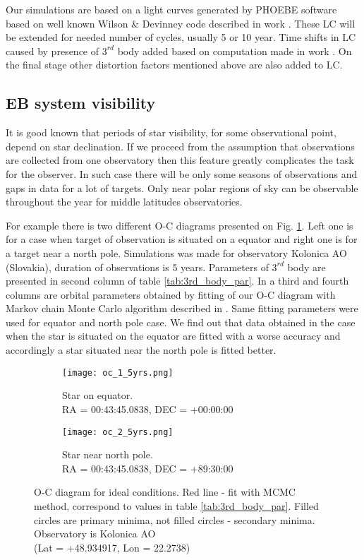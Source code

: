 Our simulations are based on a light curves generated by PHOEBE software \citep{Prsa2005} based on well known Wilson \& Devinney code described in work \cite{Wilson1971}. These LC will be extended for needed number of cycles, usually 5 or 10 year. Time shifts in LC caused by presence of $3^{rd}$ body added based on computation made in work \cite{irwin1952, irwin1959}. On the final stage other distortion factors mentioned above are also added to LC.   

\subsection{EB system visibility}

It is good known that periods of star visibility, for some observational point, depend on star declination.
If we proceed from the assumption that observations are collected from one observatory then this feature greatly complicates the task for the observer. In such case there will be only some seasons of observations and gaps in data for a lot of targets. Only near polar regions of sky can be observable throughout the year for middle latitudes observatories.

For example there is two different O-C diagrams presented on Fig. \ref{fig:oc_1}. Left one is for a case when 
target of observation is situated on a equator and right one is for a target near a north pole. Simulations was made for observatory Kolonica AO (Slovakia), duration of observations is 5 years. Parameters of $3^{rd}$ body are presented in second column of table \ref{tab:3rd_body_par}. In a third and fourth columns are orbital parameters obtained by fitting of our O-C diagram with Markov chain Monte Carlo algorithm described in \cite{Gajdos2019}. Same fitting parameters were used for equator and north pole case. We find out that data obtained in the case when the star is situated on the equator are fitted with a worse accuracy and accordingly a star situated near the north pole is fitted better.

\begin{figure}[!h]
    \centering
    \begin{subfigure}[t]{0.5\textwidth}
        \centering
        \texttt{[image: oc\_1\_5yrs.png]}
        \caption{Star on equator.\\RA = 00:43:45.0838, DEC = +00:00:00}
    \end{subfigure}%
    \begin{subfigure}[t]{0.5\textwidth}
        \centering
        \texttt{[image: oc\_2\_5yrs.png]}
        \caption{Star near north pole.\\RA = 00:43:45.0838, DEC = +89:30:00}
    \end{subfigure}
    \caption{O-C diagram for ideal conditions. Red line - fit with MCMC method, correspond to values in table \ref{tab:3rd_body_par}. Filled circles are primary minima, not filled circles - secondary minima. 
    Observatory is Kolonica AO \\(Lat = +48.934917, Lon = 22.2738)}
\label{fig:oc_1}
\end{figure}


